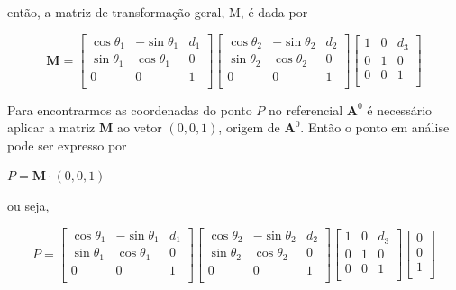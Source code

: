 \noindent então, a matriz de transformação geral, M, é dada por

\[
	\mathbf{M} = \begin{bmatrix}
		\cos\theta_1 & -\sin\theta_1 & d_1 \\
		\sin\theta_1 & \cos\theta_1  & 0   \\
		0            & 0             & 1   \\
	\end{bmatrix}
	\begin{bmatrix}
		\cos\theta_2 & -\sin\theta_2 & d_2 \\
		\sin\theta_2 & \cos\theta_2  & 0   \\
		0            & 0             & 1   \\
	\end{bmatrix}
	\begin{bmatrix}
		1 & 0 & d_3 \\
		0 & 1 & 0   \\
		0 & 0 & 1   \\
	\end{bmatrix}
\]

Para encontrarmos as coordenadas do ponto $P$ no referencial $\mathbf{A}^0$ é necessário aplicar a matriz $\mathbf{M}$ ao vetor $(0, 0, 1)$, origem de $\mathbf{A}^0$. Então o ponto em análise pode ser expresso por

\centerline{$P = \mathbf{M}\cdot(0, 0, 1)$}

\noindent ou seja,

\[
	P = \begin{bmatrix}
		\cos\theta_1 & -\sin\theta_1 & d_1 \\
		\sin\theta_1 & \cos\theta_1  & 0   \\
		0            & 0             & 1   \\
	\end{bmatrix}
	\begin{bmatrix}
		\cos\theta_2 & -\sin\theta_2 & d_2 \\
		\sin\theta_2 & \cos\theta_2  & 0   \\
		0            & 0             & 1   \\
	\end{bmatrix}
	\begin{bmatrix}
		1 & 0 & d_3 \\
		0 & 1 & 0   \\
		0 & 0 & 1   \\
	\end{bmatrix}
	\begin{bmatrix}
		0 \\
		0 \\
		1 \\
	\end{bmatrix}
\]

